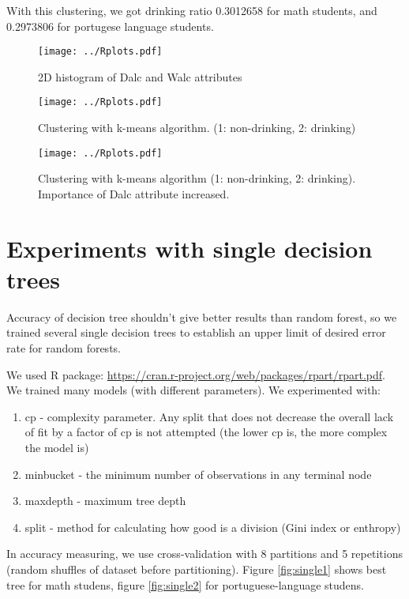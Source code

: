 \documentclass[a4paper]{article}
\begin{document}
With this clustering, we got drinking ratio 0.3012658 for math students,
and 0.2973806 for portugese language students.




\begin{figure}[H]
    \caption[]{2D histogram of Dalc and Walc attributes}
    \centering
    \texttt{[image: ../Rplots.pdf]}
    \label{fig:hist2D}
\end{figure}

\begin{figure}[H]
    \caption[]{Clustering with k-means algorithm. (1: non-drinking, 2: drinking)}
    \centering
    \texttt{[image: ../Rplots.pdf]}
    \label{fig:clust}
\end{figure}

\begin{figure}[H]
    \caption[]{Clustering with k-means algorithm (1: non-drinking, 2: drinking). Importance of Dalc attribute increased.}
    \centering
    \texttt{[image: ../Rplots.pdf]}
    \label{fig:clust2}
\end{figure}

\newpage
\section{Experiments with single decision trees}

Accuracy of decision tree shouldn't give better results than random forest,
so we trained several single decision trees to establish
an upper limit of desired error rate for random forests.

We used R package: \url{https://cran.r-project.org/web/packages/rpart/rpart.pdf}.
We trained many models (with different parameters).
We experimented with:
\begin{enumerate}
    \item cp - complexity parameter.
        Any split that does not decrease the overall lack of fit by a factor of cp is not attempted
        (the lower cp is, the more complex the model is)
    \item minbucket - the minimum number of observations in any terminal node
    \item maxdepth - maximum tree depth
    \item split - method for calculating how good is a division (Gini index or enthropy)
\end{enumerate}
In accuracy measuring, we use cross-validation with 8 partitions
and 5 repetitions (random shuffles of dataset before partitioning).
Figure \ref{fig:single1} shows best tree for math studens,
figure \ref{fig:single2} for portuguese-language studens.
\end{document}

